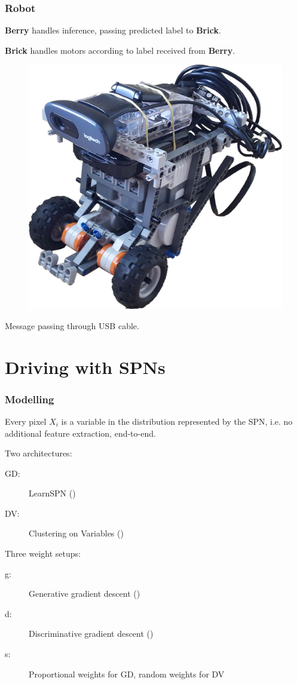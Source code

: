 \documentclass{beamer}
\begin{document}
\begin{frame}
  \frametitle{Robot}

  \textbf{Berry} handles inference, passing predicted label to \textbf{Brick}.

  \textbf{Brick} handles motors according to label received from \textbf{Berry}.

  \begin{figure}
    \centering\includegraphics[height=0.5\textheight]{imgs/robot.png}
  \end{figure}

  \centering Message passing through USB cable.
\end{frame}

\section{Driving with SPNs}

\begin{frame}
  \frametitle{Modelling}

  Every pixel $X_i$ is a variable in the distribution represented by the SPN, i.e. no additional
  feature extraction, end-to-end.

  Two architectures:
  \begin{description}
    \item[GD:] LearnSPN (\cite{gens-domingos})
    \item[DV:] Clustering on Variables (\cite{clustering})
  \end{description}
  Three weight setups:
  \begin{description}
    \item[g:] Generative gradient descent (\cite{poon-domingos})
    \item[d:] Discriminative gradient descent (\cite{discriminative})
    \item[s:] Proportional weights for GD, random weights for DV
  \end{description}
\end{frame}
\end{document}
